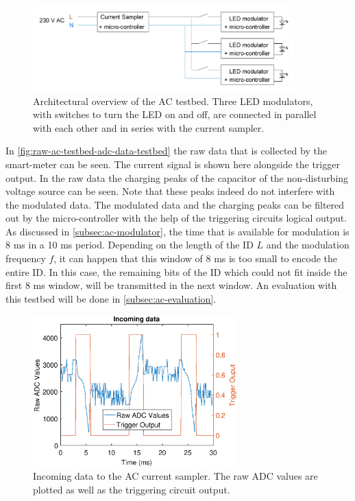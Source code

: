 \begin{figure}[h]
	\centering
	\includegraphics[angle=0,width=0.9\textwidth,keepaspectratio]{chapters/hardware-chapters/AC/ac-test-bed/ac-test-bed-architectural.JPG}
	\caption{Architectural overview of the AC testbed. Three LED modulators, with switches to turn the LED on and off, are connected in parallel with each other and in series with the current sampler.}
	\label{fig:ac-test-bed-architectural-overview}
\end{figure}



In \autoref{fig:raw-ac-testbed-adc-data-testbed} the raw data that is collected by the smart-meter can be seen.
The current signal is shown here alongside the trigger output.
In the raw data the charging peaks of the capacitor of the non-disturbing voltage source can be seen.
Note that these peaks indeed do not interfere with the modulated data.
The modulated data and the charging peaks can be filtered out by the micro-controller with the help of the triggering circuits logical output.
As discussed in \autoref{subsec:ac-modulator}, the time that is available for modulation is 8 ms in a 10 ms period.
Depending on the length of the ID $L$ and the modulation frequency $f$, it can happen that this window of 8 ms is too small to encode the entire ID.
In this case, the remaining bits of the ID which could not fit inside the first 8 ms window, will be transmitted in the next window.
An evaluation with this testbed will be done in \autoref{subsec:ac-evaluation}.



\begin{figure}[h]
  \centering
  \includegraphics[width=0.7\textwidth]{chapters/evaluation-chapters/hardware/ac/raw-ac-testbed-adc-data.eps}
    \caption{Incoming data to the AC current sampler. The raw ADC values are plotted as well as the triggering circuit output.}
  \label{fig:raw-ac-testbed-adc-data-testbed}
\end{figure}

